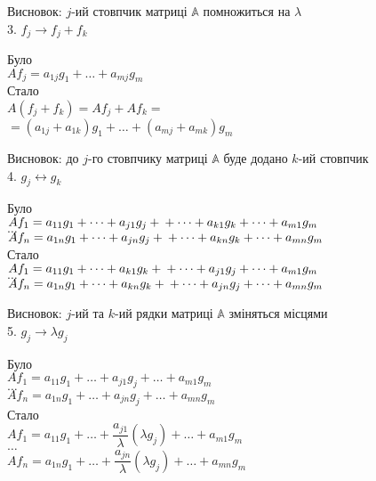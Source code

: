\documentclass[a4paper, 10pt]{article}
\theoremstyle{theoremdd}
\begin{document}
	Висновок: $j$-ий стовпчик матриці $\mathbb{A}$ помножиться на $\lambda$
	\bigskip \\
	3. $f_j \rightarrow f_j+f_k$
\multicolsep=0pt
	\begin{multicols}{2}
	Було \\
$Af_j = a_{1j}g_1 + \dots + a_{mj}g_m$
	\columnbreak
	\\
	Стало \\
$A(f_j+f_k) = Af_j + Af_k =$\\
$= (a_{1j}+a_{1k})g_1 + \dots + (a_{mj}+a_{mk})g_m$
	\end{multicols}
	Висновок: до $j$-го стовпчику матриці $\mathbb{A}$ буде додано $k$-ий стовпчик
	\bigskip \\
	
	4. $g_j \leftrightarrow g_k$
	\multicolsep=0pt
	\begin{multicols}{2}
	Було \\
	$Af_1 = a_{11}g_1 + \dots + a_{j1}g_j + \\
	+ \dots + a_{k1}g_k + \dots + a_{m1}g_m$ \\
	$\dots$\\
	$Af_n = a_{1n}g_1 + \dots + a_{jn}g_j + \\
	+ \dots + a_{kn}g_k + \dots + a_{mn}g_m$
	\columnbreak
	\\
	Стало \\
	$Af_1 = a_{11}g_1 + \dots + a_{k1}g_k + \\
	+ \dots + a_{j1}g_j + \dots + a_{m1}g_m$ \\
	$\dots$\\
	$Af_n = a_{1n}g_1 + \dots + a_{kn}g_k + \\
	+ \dots + a_{jn}g_j + \dots + a_{mn}g_m$
	\end{multicols}
	Висновок: $j$-ий та $k$-ий рядки матриці $\mathbb{A}$ зміняться місцями
	\bigskip \\
	5. $g_j \rightarrow \lambda g_j$
	\multicolsep=0pt
	\begin{multicols}{2}
	Було \\
	$Af_1 = a_{11}g_1 + \dots + a_{j1}g_j + \dots + a_{m1}g_m$\\
	$\dots$\\
	$Af_n = a_{1n}g_1 + \dots + a_{jn}g_j + \dots + a_{mn}g_m$
	\columnbreak
	\\
	Стало \\
	$Af_1 = a_{11}g_1 + \dots + \dfrac{a_{j1}}{\lambda} (\lambda g_j) + \dots + a_{m1}g_m$\\
	$\dots$\\
	$Af_n = a_{1n}g_1 + \dots + \dfrac{a_{jn}}{\lambda} (\lambda g_j) + \dots + a_{mn}g_m$
	\end{multicols}
\end{document}
